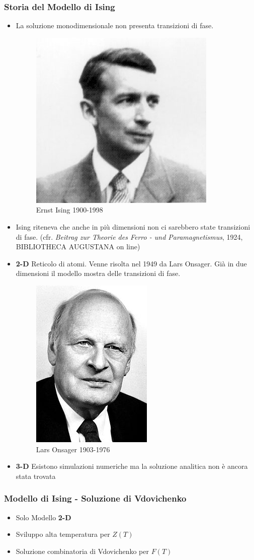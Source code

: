 \documentclass[11pt]{beamer}
\begin{document}
\begin{frame}
	\frametitle{Storia del Modello di Ising}
\begin{itemize}
\item<1->{La soluzione monodimensionale non presenta transizioni di fase. 
	\begin{figure}[r]
	\centering
	\includegraphics[width=0.2\columnwidth]{pt4}
	\caption{Ernst Ising 1900-1998}
	\label{fig1}
	\end{figure}
	}
	\item<2->{Ising riteneva che anche in più dimensioni non ci sarebbero state transizioni di fase. (cfr. \emph{Beitrag zur Theorie des
Ferro - und Paramagnetismus}, 1924, BIBLIOTHECA AUGUSTANA on line)}
\end{itemize}
\end{frame}
	
\begin{frame}
	\begin{itemize}
	\frametitle{Storia del Modello di Ising}
 	\item{\textbf{2-D} Reticolo di atomi. Venne risolta nel 1949 da Lars Onsager. Già in due dimensioni il modello mostra delle transizioni di fase.}
 	\begin{figure}[r]
	\centering
	\includegraphics[width=0.2\columnwidth]{pt5}
	\caption{Lars Onsager 1903-1976}
	\label{fig1}
	\end{figure}
 	\item{\textbf{3-D} Esistono simulazioni numeriche ma la soluzione analitica non è ancora stata trovata}
 	\end{itemize}
 \end{frame}
 \begin{frame}
 \frametitle{Modello di Ising - Soluzione di Vdovichenko}
\begin{itemize}
\item<1->{Solo Modello \textbf{2-D}}
\item<2->{Sviluppo alta temperatura per \textbf{$Z(T)$}}
\item<3->{Soluzione combinatoria di Vdovichenko per \textbf{$F(T)$}}
\end{itemize}

\end{frame}
\end{document}
